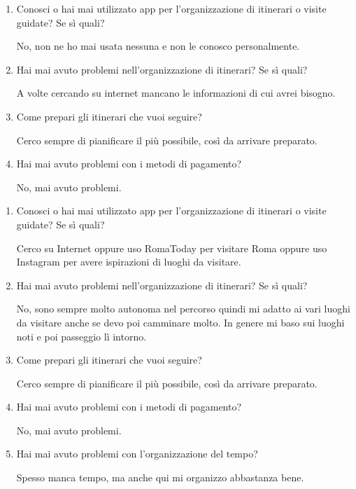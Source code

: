 \clearpage
{}

\begin{enumerate}

\item Conosci o hai mai utilizzato app per l'organizzazione di itinerari o visite guidate? Se sì quali?

No, non ne ho mai usata nessuna e non le conosco personalmente.

\item Hai mai avuto problemi nell'organizzazione di itinerari? Se sì quali?

A volte cercando su internet mancano le informazioni di cui avrei bisogno.

\item Come prepari gli itinerari che vuoi seguire?

Cerco sempre di pianificare il più possibile, così da arrivare preparato.

\item Hai mai avuto problemi con i metodi di pagamento?

No, mai avuto problemi.

\end{enumerate}

\clearpage
{}

\begin{enumerate}

\item Conosci o hai mai utilizzato app per l'organizzazione di itinerari o visite guidate? Se sì quali?

Cerco su Internet oppure uso RomaToday per visitare Roma oppure uso Instagram per avere ispirazioni di luoghi da visitare.

\item Hai mai avuto problemi nell'organizzazione di itinerari? Se sì quali?

No, sono sempre molto autonoma nel percorso quindi mi adatto ai vari luoghi da visitare anche se devo poi camminare molto. In genere mi baso sui luoghi noti e poi passeggio lì intorno.

\item Come prepari gli itinerari che vuoi seguire?

Cerco sempre di pianificare il più possibile, così da arrivare preparato.

\item Hai mai avuto problemi con i metodi di pagamento?

No, mai avuto problemi.

\item Hai mai avuto problemi con l'organizzazione del tempo?

Spesso manca tempo, ma anche qui mi organizzo abbastanza bene.

\end{enumerate}


